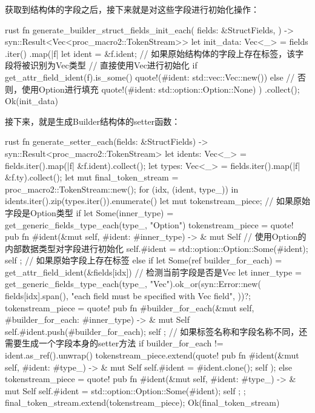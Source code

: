 获取到结构体的字段之后，接下来就是对这些字段进行初始化操作：
\begin{code-block}{rust}
fn generate_builder_struct_fields_init_each(
    fields: &StructFields,
) -> syn::Result<Vec<proc_macro2::TokenStream>> {
    let init_data: Vec<_> = fields
        .iter()
        .map(|f| {
            let ident = &f.ident;
            // 如果原始结构体的字段上存在标签，该字段将被识别为Vec类型
            // 直接使用Vec进行初始化
            if get_attr_field_ident(f).is_some() {
                quote!(#ident: std::vec::Vec::new())
            } else {
                // 否则，使用Option进行填充
                quote!(#ident: std::option::Option::None)
            }
        })
        .collect();
    Ok(init_data)
}
\end{code-block}

接下来，就是生成Builder结构体的setter函数：
\begin{code-block}{rust}
fn generate_setter_each(fields: &StructFields) -> syn::Result<proc_macro2::TokenStream> {
    let idents: Vec<_> = fields.iter().map(|f| &f.ident).collect();
    let types: Vec<_> = fields.iter().map(|f| &f.ty).collect();
    let mut final_token_stream = proc_macro2::TokenStream::new();
    for (idx, (ident, type_)) in idents.iter().zip(types.iter()).enumerate() {
        let mut tokenstream_piece;
        // 如果原始字段是Option类型
        if let Some(inner_type) = get_generic_fields_type_each(type_, "Option") {
            tokenstream_piece = quote! {
                pub fn #ident(&mut self, #ident: #inner_type) -> & mut Self {
                    // 使用Option的内部数据类型对字段进行初始化
                    self.#ident = std::option::Option::Some(#ident);
                    self
                }
            };
        // 如果原始字段上存在标签
        } else if let Some(ref builder_for_each) = get_attr_field_ident(&fields[idx]) {
            // 检测当前字段是否是Vec
            let inner_type = get_generic_fields_type_each(type_, "Vec").ok_or(syn::Error::new(
                fields[idx].span(),
                "each field must be specified with Vec field",
            ))?;
            tokenstream_piece = quote! {
                pub fn #builder_for_each(&mut self, #builder_for_each: #inner_type) -> & mut Self {
                    self.#ident.push(#builder_for_each);
                    self
                }
            };
            // 如果标签名称和字段名称不同，还需要生成一个字段本身的setter方法
            if builder_for_each != ident.as_ref().unwrap() {
                tokenstream_piece.extend(quote! {
                    pub fn #ident(&mut self, #ident: #type_) -> & mut Self {
                        self.#ident = #ident.clone();
                        self
                    }
                });
            }
        } else {
            tokenstream_piece = quote! {
                pub fn #ident(&mut self, #ident: #type_) -> & mut Self {
                    self.#ident = std::option::Option::Some(#ident);
                    self
                }
            };
        };
        final_token_stream.extend(tokenstream_piece);
    }
    Ok(final_token_stream)
}
\end{code-block}

